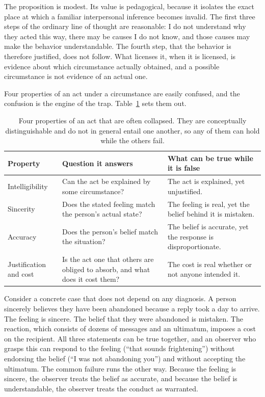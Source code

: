 \documentclass[11pt]{article}
\theoremstyle{definition}
\theoremstyle{remark}
\begin{document}
The proposition is modest. Its value is pedagogical, because it isolates the exact place at which a familiar interpersonal inference becomes invalid. The first three steps of the ordinary line of thought are reasonable: I do not understand why they acted this way, there may be causes I do not know, and those causes may make the behavior understandable. The fourth step, that the behavior is therefore justified, does not follow. What licenses it, when it is licensed, is evidence about which circumstance actually obtained, and a possible circumstance is not evidence of an actual one.

Four properties of an act under a circumstance are easily confused, and the confusion is the engine of the trap. Table~\ref{tab:four} sets them out.

\begin{table}[ht]
\centering
\small
\begin{tabular}{@{}p{}p{}p{}@{}}
\toprule
Property & Question it answers & What can be true while it is false \\
\midrule
Intelligibility & Can the act be explained by some circumstance? & The act is explained, yet unjustified. \\
Sincerity & Does the stated feeling match the person's actual state? & The feeling is real, yet the belief behind it is mistaken. \\
Accuracy & Does the person's belief match the situation? & The belief is accurate, yet the response is disproportionate. \\
Justification and cost & Is the act one that others are obliged to absorb, and what does it cost them? & The cost is real whether or not anyone intended it. \\
\bottomrule
\end{tabular}
\caption{Four properties of an act that are often collapsed. They are conceptually distinguishable and do not in general entail one another, so any of them can hold while the others fail.}
\label{tab:four}
\end{table}

Consider a concrete case that does not depend on any diagnosis. A person sincerely believes they have been abandoned because a reply took a day to arrive. The feeling is sincere. The belief that they were abandoned is mistaken. The reaction, which consists of dozens of messages and an ultimatum, imposes a cost on the recipient. All three statements can be true together, and an observer who grasps this can respond to the feeling (``that sounds frightening'') without endorsing the belief (``I was not abandoning you'') and without accepting the ultimatum. The common failure runs the other way. Because the feeling is sincere, the observer treats the belief as accurate, and because the belief is understandable, the observer treats the conduct as warranted.
\end{document}

